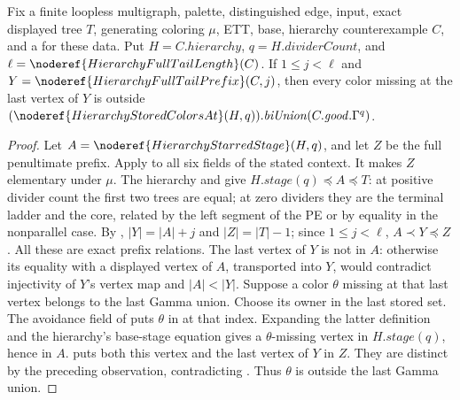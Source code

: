 \begin{lemma}
Fix a finite loopless multigraph, palette, distinguished edge, input,
exact displayed tree \(T\), generating coloring \(\mu\), ETT, base,
hierarchy counterexample \(C\), and a
 for these data.
Put \(H=C.\mathit{hierarchy}\), \(q=H.\mathit{dividerCount}\), and
\(\ell=\noderef{HierarchyFullTailLength}(C)\).
If \(1\le j<\ell\) and \(Y=\noderef{HierarchyFullTailPrefix}(C,j)\),
then every color missing at the last vertex of \(Y\) is outside
\((\noderef{HierarchyStoredColorsAt}(H,q)).\mathit{biUnion}
(C.\mathit{good}.\Gamma^q)\).
\end{lemma}
\begin{proof}
Let \(A=\noderef{HierarchyStarredStage}(H,q)\), and let \(Z\) be the
full penultimate prefix. Apply
 to all six
fields of the stated context. It makes \(Z\) elementary under \(\mu\).
The hierarchy and  give
\(H.\mathit{stage}(q)\preccurlyeq A\preccurlyeq T\):
at positive divider count the first two trees are equal; at zero
dividers they are the terminal ladder and the core, related by the
left segment of the PE  or by equality
in the nonparallel case. By ,
\(|Y|=|A|+j\) and \(|Z|=|T|-1\); since \(1\le j<\ell\),
\(A\prec Y\preccurlyeq Z\). All these are exact prefix relations.
The last vertex of \(Y\) is not in \(A\): otherwise its equality
with a displayed vertex of \(A\), transported into \(Y\), would
contradict injectivity of \(Y\)'s vertex map and \(|A|<|Y|\).
Suppose a color \(\theta\) missing at that last vertex belongs to the
last Gamma union. Choose its owner in the last stored set. The avoidance
field of  puts \(\theta\) in
 at that index. Expanding the
latter definition and the hierarchy's base-stage equation gives a
\(\theta\)-missing vertex in \(H.\mathit{stage}(q)\), hence in
\(A\).  puts
both this vertex and the last vertex of \(Y\) in \(Z\).
They are distinct by the preceding observation, contradicting
. Thus \(\theta\) is outside
the last Gamma union.
\end{proof}
